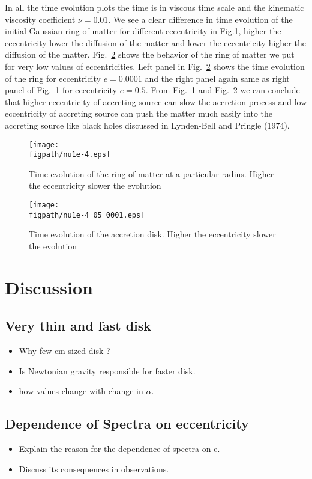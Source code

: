 \documentclass[useAMS,usenatbib]{mn2e}
\newcommand{\figpath}{./Figs/}
\begin{document}
In all the time evolution plots the time is in viscous time scale and the kinematic viscosity coefficient $\nu = 0.01$. We see a clear difference in time evolution of the initial Gaussian ring of matter for different eccentricity in Fig.\ref{evolve}, higher the eccentricity lower the diffusion of the matter and lower the eccentricity higher the diffusion of the matter. Fig.~\ref{evolve1e-4} shows the behavior of the ring of matter we put for very low values of eccentricities. Left panel in Fig.~\ref{evolve1e-4} shows the time evolution of the ring for eccentricity $e = 0.0001$ and the right panel again same as right panel of Fig.~\ref{evolve} for eccentricity $e = 0.5$. From Fig.~\ref{evolve} and Fig.~\ref{evolve1e-4} we can conclude that higher eccentricity of accreting source can slow the accretion process and low eccentricity of accreting source can push the matter much easily into the accreting source like black holes discussed in Lynden-Bell and Pringle (1974).  
\begin{figure}
\centering
\texttt{[image: \\figpath/nu1e-4.eps]}
\caption{Time evolution of the ring of matter at a particular radius. Higher the eccentricity slower the evolution}
\label{evolve}
\end{figure}
\begin{figure}
\centering
\texttt{[image: \\figpath/nu1e-4\_05\_0001.eps]}
\caption{Time evolution of the accretion disk. Higher the eccentricity slower the evolution}
\label{evolve1e-4}
\end{figure}
\section{Discussion}
\subsection{Very thin and fast disk}
\begin{itemize}
\item Why few cm sized disk ?
\item Is Newtonian gravity responsible for faster disk. 
\item how values change with change in $\alpha$. 
\end{itemize}
\subsection{Dependence of Spectra on eccentricity}
\begin{itemize}
\item Explain the reason for the dependence of spectra on e. 
\item Discuss its consequences in observations.
\end{itemize}
\end{document}
